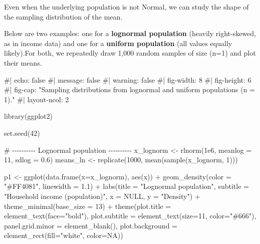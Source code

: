 \documentclass[
  letterpaper,
  DIV=11,
  numbers=noendperiod]{scrreprt}
\newenvironment{Shaded}{\begin{snugshade}}{\end{snugshade}}
\newcommand{\AttributeTok}[1]{\textcolor[rgb]{0.40,0.45,0.13}{#1}}
\newcommand{\CommentTok}[1]{\textcolor[rgb]{0.37,0.37,0.37}{#1}}
\newcommand{\ConstantTok}[1]{\textcolor[rgb]{0.56,0.35,0.01}{#1}}
\newcommand{\DecValTok}[1]{\textcolor[rgb]{0.68,0.00,0.00}{#1}}
\newcommand{\FloatTok}[1]{\textcolor[rgb]{0.68,0.00,0.00}{#1}}
\newcommand{\FunctionTok}[1]{\textcolor[rgb]{0.28,0.35,0.67}{#1}}
\newcommand{\NormalTok}[1]{\textcolor[rgb]{0.00,0.23,0.31}{#1}}
\newcommand{\OtherTok}[1]{\textcolor[rgb]{0.00,0.23,0.31}{#1}}
\newcommand{\SpecialCharTok}[1]{\textcolor[rgb]{0.37,0.37,0.37}{#1}}
\newcommand{\StringTok}[1]{\textcolor[rgb]{0.13,0.47,0.30}{#1}}
\begin{document}
Even when the underlying population is not Normal, we can study the
shape of the sampling distribution of the mean.

Below are two examples: one for a \textbf{lognormal population} (heavily
right-skewed, as in income data) and one for a \textbf{uniform
population} (all values equally likely).For both, we repeatedly draw
1,000 random samples of size (n=1) and plot their means.

\begin{Shaded}
\begin{Highlighting}[]
\CommentTok{\#| echo: false}
\CommentTok{\#| message: false}
\CommentTok{\#| warning: false}
\CommentTok{\#| fig{-}width: 8}
\CommentTok{\#| fig{-}height: 6}
\CommentTok{\#| fig{-}cap: "Sampling distributions from lognormal and uniform populations (n = 1)."}
\CommentTok{\#| layout{-}ncol: 2}

\FunctionTok{library}\NormalTok{(ggplot2)}

\FunctionTok{set.seed}\NormalTok{(}\DecValTok{42}\NormalTok{)}

\CommentTok{\# {-}{-}{-}{-}{-}{-}{-}{-}{-}{-} Lognormal population {-}{-}{-}{-}{-}{-}{-}{-}{-}{-}}
\NormalTok{x\_lognorm }\OtherTok{\textless{}{-}} \FunctionTok{rlnorm}\NormalTok{(}\FloatTok{1e6}\NormalTok{, }\AttributeTok{meanlog =} \DecValTok{11}\NormalTok{, }\AttributeTok{sdlog =} \FloatTok{0.6}\NormalTok{)}
\NormalTok{means\_ln  }\OtherTok{\textless{}{-}} \FunctionTok{replicate}\NormalTok{(}\DecValTok{1000}\NormalTok{, }\FunctionTok{mean}\NormalTok{(}\FunctionTok{sample}\NormalTok{(x\_lognorm, }\DecValTok{1}\NormalTok{)))}

\NormalTok{p1 }\OtherTok{\textless{}{-}} \FunctionTok{ggplot}\NormalTok{(}\FunctionTok{data.frame}\NormalTok{(}\AttributeTok{x=}\NormalTok{x\_lognorm), }\FunctionTok{aes}\NormalTok{(x)) }\SpecialCharTok{+}
  \FunctionTok{geom\_density}\NormalTok{(}\AttributeTok{color =} \StringTok{"\#FF4081"}\NormalTok{, }\AttributeTok{linewidth =} \FloatTok{1.1}\NormalTok{) }\SpecialCharTok{+}
  \FunctionTok{labs}\NormalTok{(}\AttributeTok{title =} \StringTok{"Lognormal population"}\NormalTok{,}
       \AttributeTok{subtitle =} \StringTok{"Household income (population)"}\NormalTok{,}
       \AttributeTok{x =} \ConstantTok{NULL}\NormalTok{, }\AttributeTok{y =} \StringTok{"Density"}\NormalTok{) }\SpecialCharTok{+}
  \FunctionTok{theme\_minimal}\NormalTok{(}\AttributeTok{base\_size =} \DecValTok{13}\NormalTok{) }\SpecialCharTok{+}
  \FunctionTok{theme}\NormalTok{(}\AttributeTok{plot.title =} \FunctionTok{element\_text}\NormalTok{(}\AttributeTok{face=}\StringTok{"bold"}\NormalTok{),}
        \AttributeTok{plot.subtitle =} \FunctionTok{element\_text}\NormalTok{(}\AttributeTok{size=}\DecValTok{11}\NormalTok{, }\AttributeTok{color=}\StringTok{"\#666"}\NormalTok{),}
        \AttributeTok{panel.grid.minor =} \FunctionTok{element\_blank}\NormalTok{(),}
        \AttributeTok{plot.background =} \FunctionTok{element\_rect}\NormalTok{(}\AttributeTok{fill=}\StringTok{"white"}\NormalTok{, }\AttributeTok{color=}\ConstantTok{NA}\NormalTok{))}


\end{Highlighting}
\end{Shaded}
\end{document}
